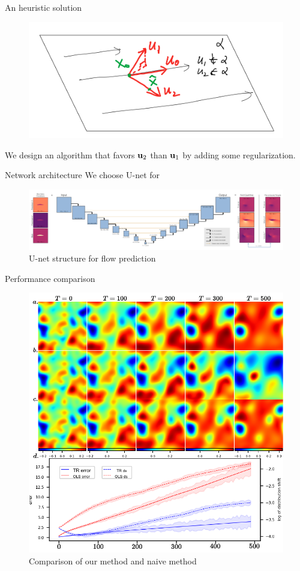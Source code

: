 \documentclass[NUS-Kajima workshop]{beamer}
\begin{document}
\begin{frame}{An heuristic solution}
	\begin{figure}[H]
		\centering
		\centerline{\includegraphics[width=0.9\linewidth]{fig/mfd.png}}
	  \end{figure}
	  We design an algorithm that favors $\mathbf{u}_2$ than $\mathbf{u}_1$ by adding some regularization.
\end{frame}

\begin{frame}{Network architecture}
	We choose U-net for 
	\begin{figure}[H]
          \centering
          \centerline{\includegraphics[width=1.1\linewidth]{fig/Unet.png}}
          \caption{U-net structure for flow prediction\footnotemark}
\end{figure}
\end{frame}

\begin{frame}{Performance comparison}
	\begin{figure}[H]
          \centering
          \centerline{\includegraphics[width=.7\linewidth]{fig/RD-TR.pdf}}
          \caption{Comparison of our method and naive method}
\end{figure}
\end{frame}
\end{document}
